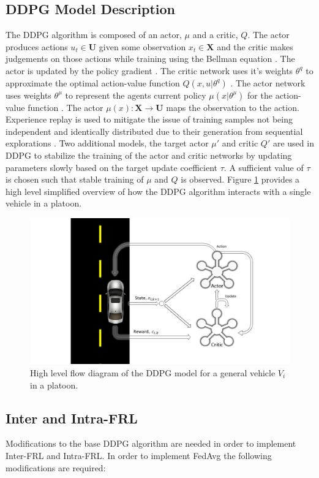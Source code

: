 \subsection{DDPG Model Description}
The DDPG algorithm is composed of an actor, $\mu$ and a critic, $Q$. The actor produces
actions $u_t \in \mathbf{U}$ given some observation $x_t \in \mathbf{X}$ and the critic
makes judgements on those actions while training using the Bellman equation
\cite{Lillicrap2016, sutton2018reinforcement}. The actor is updated by the policy gradient
\cite{Lillicrap2016}.  The critic network uses it's weights $\theta^q$ to approximate the
optimal action-value function $Q(x, u|\theta^q)$ \cite{Lillicrap2016}.  The actor network
uses weights $\theta^\mu$ to represent the agents current policy $\mu(x|\theta^\mu)$ for
the action-value function \cite{Lillicrap2016}.  The actor
$\mu(x): \mathbf{X} \xrightarrow{} \mathbf{U}$ maps the observation to the action.
Experience replay is used to mitigate the issue of training samples not being independent
and identically distributed due to their generation from sequential explorations
\cite{Lillicrap2016}.  Two additional models, the target actor $\mu'$ and critic $Q'$
are used in DDPG to stabilize the training of the actor and critic networks by updating
parameters slowly based on the target update coefficient $\tau$.  A sufficient value of
$\tau$ is chosen such that stable training of $\mu$ and $Q$ is observed.
Figure \ref{fig:ddpgdraw} provides a high level simplified overview of how the DDPG
algorithm interacts with a single vehicle in a platoon.

\begin{figure}[H]
    \centering
    \includegraphics[width=0.6\linewidth]{assets/ddpg.PNG}
    \caption{High level flow diagram of the DDPG model for a general vehicle $V_i$ in a platoon.}
    \label{fig:ddpgdraw}
\end{figure}

\subsection{Inter and Intra-FRL}
Modifications to the base DDPG algorithm are needed in order to implement Inter-FRL and
Intra-FRL.  In order to implement FedAvg the following modifications are required:


